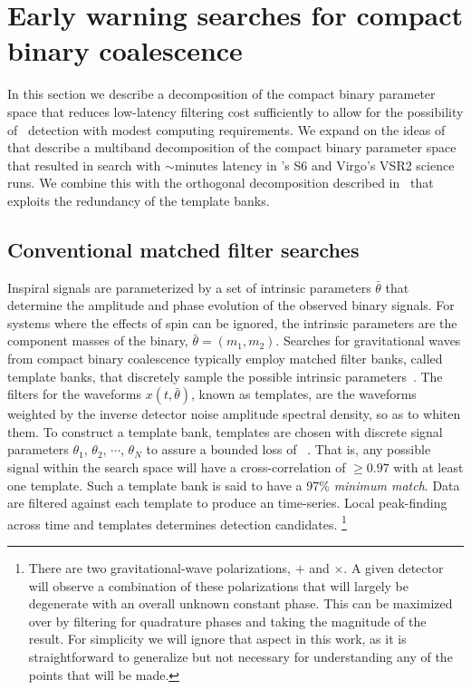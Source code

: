 \section{Early warning searches for compact binary coalescence}
\label{SECII}\label{sec:method}

In this section we describe a decomposition of the compact binary parameter
space that reduces low-latency filtering cost sufficiently to allow for the
possibility of \earlywarning\ detection with modest computing requirements.  We
expand on the ideas of~\cite{Marion2004, Buskulic2010} that describe a
multiband decomposition of the compact binary parameter space that resulted in
search with $\sim$minutes latency in \LIGO{}'s S6 and Virgo's VSR2 science runs.
We combine this with the orthogonal decomposition described
in~\cite{Cannon:2010p10398} that exploits the redundancy of the template banks.

\subsection{Conventional \CBC{} matched filter searches}

Inspiral signals are parameterized by a set of intrinsic parameters
$\bar{\theta}$ that determine the amplitude and phase evolution of the observed
binary signals. For systems where the effects of spin can be ignored, the
intrinsic parameters are the component masses of the binary, $\bar{\theta} =
(m_1, m_2)$. Searches for gravitational waves from compact binary coalescence
typically employ matched filter banks, called template banks, that discretely
sample the possible intrinsic parameters~\cite{findchirppaper}.  The filters
for the waveforms $x(t,\bar{\theta})$, known as templates, are the waveforms
weighted by the inverse detector noise amplitude spectral density, so as to
whiten them. To construct a template bank, templates are chosen with discrete
signal parameters $\theta_1,\, \theta_2,\, \cdots$, $\theta_N$ to assure a
bounded loss of \SNR~\cite{Owen:1995tm,Owen:1998dk}. That is, any possible
signal within the search space will have a cross-correlation of $\geq0.97$ with
at least one template. Such a template bank is said to have a 97\% {\em
minimum match}. Data are filtered against each template to produce an \SNR
time-series. Local peak-finding across time and templates determines detection
candidates.
%
\footnote{There are two gravitational-wave polarizations, $+$ and $\times$. A
given detector will observe a combination of these polarizations that will
largely be degenerate with an overall unknown constant phase.  This can be
maximized over by filtering for quadrature phases and taking the magnitude of
the result. For simplicity we will ignore that aspect in this work, as it is
straightforward to generalize but not necessary for understanding any of the
points that will be made.}

